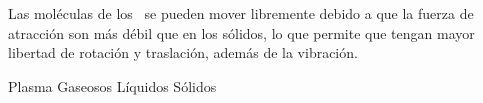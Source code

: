 
\question Las moléculas de los \fillin\ se pueden mover libremente debido a
  que la fuerza de atracción son más débil que en los sólidos, lo que permite
  que tengan mayor libertad de rotación y traslación, además de la vibración.

  \begin{oneparchoices}
    \choice Plasma
    \choice Gaseosos
    \CorrectChoice Líquidos
    \choice Sólidos
  \end{oneparchoices}
  \answerline[C]
